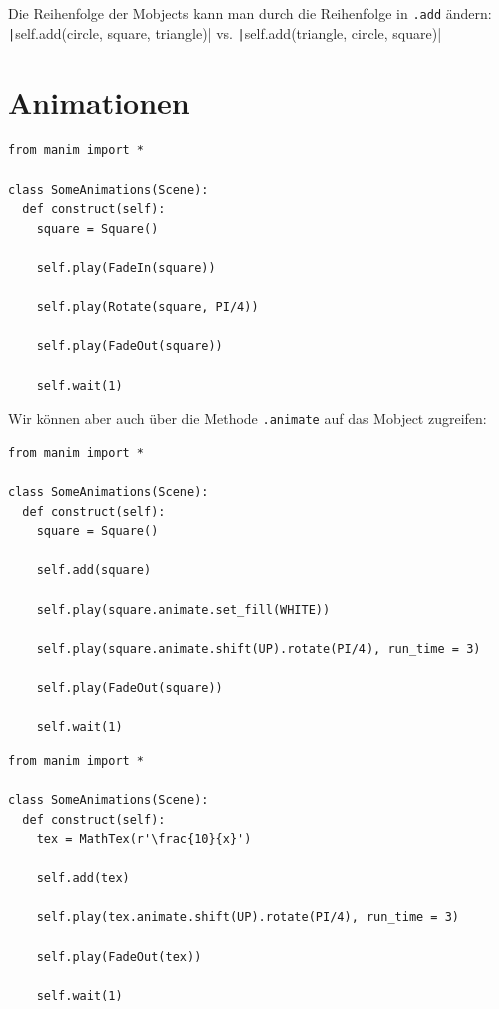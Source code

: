 \documentclass[12pt]{article}
\begin{document}
Die Reihenfolge der Mobjects kann man durch die Reihenfolge in \verb*|.add| ändern: \texttt|self.add(circle, square, triangle)| vs. \texttt|self.add(triangle, circle, square)|

	\section{Animationen}
	
\begin{verbatim}
from manim import *

class SomeAnimations(Scene):
  def construct(self):
    square = Square()

    self.play(FadeIn(square))

    self.play(Rotate(square, PI/4))

    self.play(FadeOut(square))

    self.wait(1)
\end{verbatim}

Wir können aber auch über die Methode \verb*|.animate| auf das Mobject zugreifen:

\begin{verbatim}
from manim import *
	
class SomeAnimations(Scene):
  def construct(self):
	square = Square()
	
	self.add(square)
	
	self.play(square.animate.set_fill(WHITE))
	
	self.play(square.animate.shift(UP).rotate(PI/4), run_time = 3)
	
	self.play(FadeOut(square))
	
	self.wait(1)
\end{verbatim}

\begin{verbatim}
from manim import *
	
class SomeAnimations(Scene):
  def construct(self):
	tex = MathTex(r'\frac{10}{x}')
	
	self.add(tex)
	
	self.play(tex.animate.shift(UP).rotate(PI/4), run_time = 3)
	
	self.play(FadeOut(tex))
	
	self.wait(1)
\end{verbatim}
	
\end{document}
